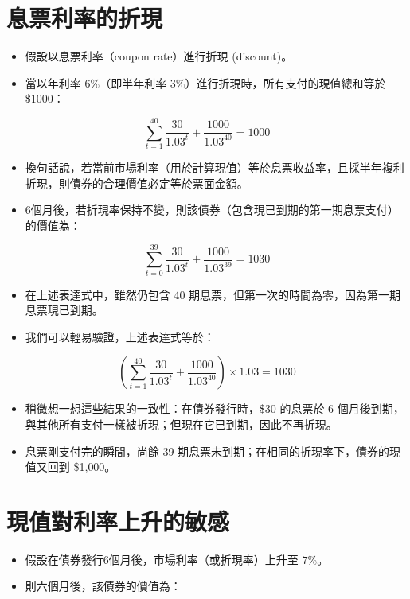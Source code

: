 \documentclass[letterpaper]{article}
\begin{document}
\section*{息票利率的折現}

\begin{itemize}
	\item 假設以息票利率（coupon rate）進行折現 (discount)。
	\item 當以年利率 \(6\%\)（即半年利率 \(3\%\)）進行折現時，所有支付的現值總和等於 \$1000：
\end{itemize}

$$
\sum_{t=1}^{40} \frac{30}{1.03^{t}}+\frac{1000}{1.03^{40}}=1000
$$

\begin{itemize}
	\item 換句話說，若當前市場利率（用於計算現值）等於息票收益率，且採半年複利折現，則債券的合理價值必定等於票面金額。
	\item 6個月後，若折現率保持不變，則該債券（包含現已到期的第一期息票支付）的價值為：
\end{itemize}


$$
\sum_{t=0}^{39} \frac{30}{1.03^{t}}+\frac{1000}{1.03^{39}}=1030
$$

\begin{itemize}
	\item 在上述表達式中，雖然仍包含 40 期息票，但第一次的時間為零，因為第一期息票現已到期。
	\item 我們可以輕易驗證，上述表達式等於：
\end{itemize}


$$
\left(\sum_{t=1}^{40} \frac{30}{1.03^{t}}+\frac{1000}{1.03^{40}}\right) \times 1.03=1030
$$

\begin{itemize}
	\item 稍微想一想這些結果的一致性：在債券發行時，\$30 的息票於 6 個月後到期，與其他所有支付一樣被折現；但現在它已到期，因此不再折現。
	\item 息票剛支付完的瞬間，尚餘 39 期息票未到期；在相同的折現率下，債券的現值又回到 \$1{,}000。
\end{itemize}

\section{現值對利率上升的敏感}

\begin{itemize}
	\item 假設在債券發行6個月後，市場利率（或折現率）上升至 \(7\%\)。
	\item 則六個月後，該債券的價值為：
\end{itemize}
\end{document}
